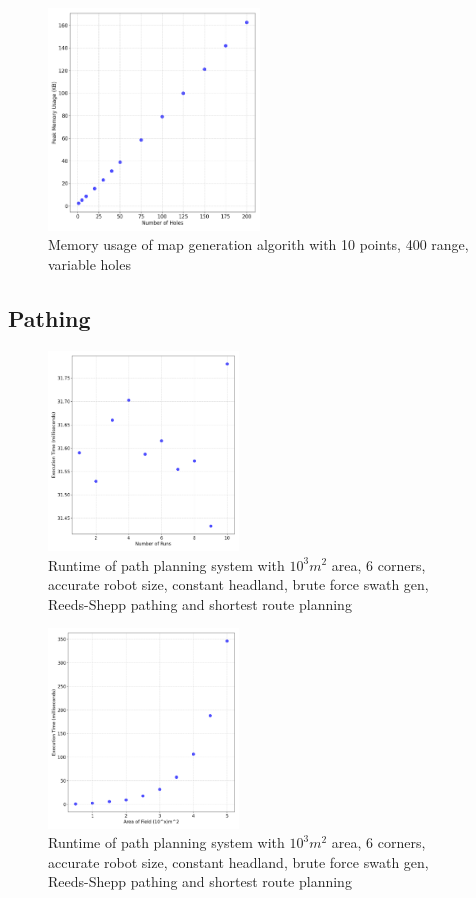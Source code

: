 \documentclass[final]{cmpreport_02}
\begin{document}
\begin{figure}[h!]
	\centering
	\includegraphics[width=0.5\textwidth]{./images/mapGenHolesMem.png}
	\caption{Memory usage of map generation algorith with 10 points, 400 range, variable holes}
	\label{PE:mg:memHoles}
\end{figure}


\clearpage
\subsection{Pathing}
\begin{figure}[h!]
	\centering
	\includegraphics[width=0.45\textwidth]{./images/pathingBaseLineRT.png}
	\caption{Runtime of path planning system with $10^3m^2$ area, 6 corners, accurate robot size, constant headland, brute force swath gen, Reeds-Shepp pathing and shortest route planning}
	\label{PE:p:BaselineRT}
\end{figure}


\begin{figure}[h!]
	\centering
	\includegraphics[width=0.45\textwidth]{./images/pathingSizeRt.png}
	\caption{Runtime of path planning system with $10^3m^2$ area, 6 corners, accurate robot size, constant headland, brute force swath gen, Reeds-Shepp pathing and shortest route planning}
	\label{PE:p:SizeRT}
\end{figure}
\end{document}
